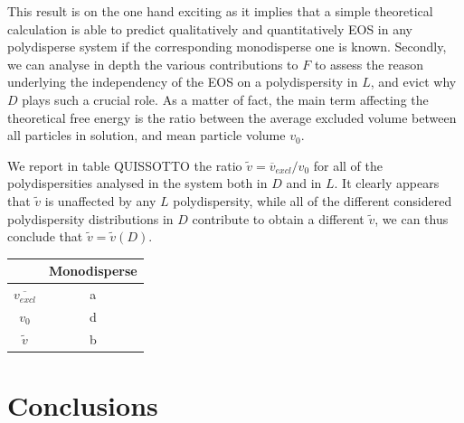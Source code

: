 \documentclass[journal=jacsat,manuscript=article]{achemso}
\begin{document}
This result is on the one hand exciting as it implies that a simple theoretical calculation is able to predict qualitatively and quantitatively EOS in any  polydisperse system if the corresponding monodisperse one is known. Secondly, we can analyse in depth the various contributions to $F$ to assess the reason underlying the independency of the EOS on a polydispersity in $L$, and evict why $D$ plays such a crucial role. As a matter of fact, the main term affecting the theoretical free energy is the ratio between the average excluded volume between all particles in solution, and mean particle volume $v_0$.

We report in table QUISSOTTO  the ratio $\tilde{v}=\overline{v}_{excl}/v_0$ for all of the polydispersities analysed in the system both in $D$ and in $L$. It clearly appears that $\tilde{v}$ is unaffected by any $L$ polydispersity, while all of the different considered polydispersity distributions in $D$ contribute to obtain a different $\tilde{v}$, we can thus conclude that $\tilde{v}=\tilde{v}(D)$. 

\begin{center}
\begin{tabular} { | c | c | }
\hline 
 & Monodisperse \\
 \hline
 $\overline{v_{excl}}$ & a  \\
 \hline
 $v_0$ & d  \\
 \hline
 $\tilde{v}$ & b \\
\hline
\end{tabular}
\end{center}

\section{Conclusions}
\end{document}

